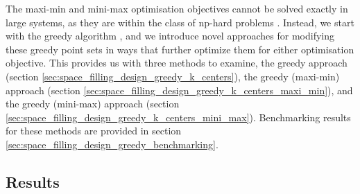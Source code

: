 \documentclass{article}
\begin{document}
The maxi-min and mini-max optimisation objectives cannot be solved exactly in large systems, as they are within the class of np-hard problems \citep{cunningham1998combinatorial}. Instead, we start with the greedy algorithm \citep{dyer1985simple}, and we introduce novel approaches for modifying these greedy point sets in ways that further optimize them for either optimisation objective. This provides us with three methods to examine, the greedy approach (section \ref{sec:space_filling_design_greedy_k_centers}), the greedy (maxi-min) approach (section \ref{sec:space_filling_design_greedy_k_centers_maxi_min}), and the greedy (mini-max) approach (section \ref{sec:space_filling_design_greedy_k_centers_mini_max}). Benchmarking results for these methods are provided in section \ref{sec:space_filling_design_greedy_benchmarking}.

\subsection{Results}
\end{document}
